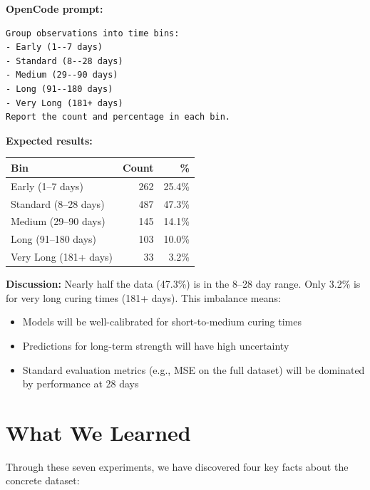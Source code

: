 \documentclass[11pt]{article}
\begin{document}
\textbf{OpenCode prompt:}
\begin{lstlisting}[style=term]
Group observations into time bins:
- Early (1--7 days)
- Standard (8--28 days)
- Medium (29--90 days)
- Long (91--180 days)
- Very Long (181+ days)
Report the count and percentage in each bin.
\end{lstlisting}

\textbf{Expected results:}
\begin{center}
\begin{tabular}{l r r}
\toprule
\textbf{Bin} & \textbf{Count} & \textbf{\%} \\
\midrule
Early (1--7 days)     & 262 & 25.4\% \\
Standard (8--28 days) & 487 & 47.3\% \\
Medium (29--90 days)  & 145 & 14.1\% \\
Long (91--180 days)   & 103 & 10.0\% \\
Very Long (181+ days) &  33 &  3.2\% \\
\bottomrule
\end{tabular}
\end{center}

\textbf{Discussion:}
Nearly half the data (47.3\%) is in the 8--28 day range.  Only 3.2\% is for very long curing times (181+ days).  This imbalance means:
\begin{itemize}[nosep]
  \item Models will be well-calibrated for short-to-medium curing times
  \item Predictions for long-term strength will have high uncertainty
  \item Standard evaluation metrics (e.g., MSE on the full dataset) will be dominated by performance at 28 days
\end{itemize}

\section{What We Learned}
\label{sec:learnings}

Through these seven experiments, we have discovered four key facts about the concrete dataset:
\end{document}
